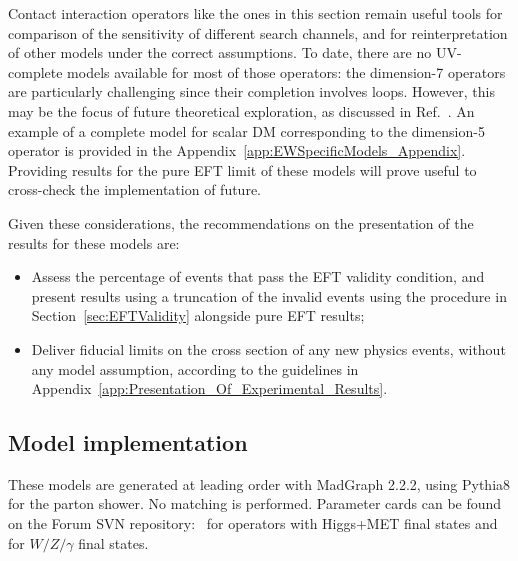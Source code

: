 Contact interaction operators like the ones in this section 
remain useful tools for comparison of the sensitivity of different search channels, 
and for reinterpretation of other models under the correct assumptions. 
To date, there are no UV-complete models available for most of those operators:
the dimension-7 operators are particularly challenging since their completion involves loops.
However, this may be the focus of future theoretical exploration, as discussed in Ref.~\cite{Crivellin:2015wva}.
An example of a complete model 
for scalar DM corresponding to the dimension-5 operator 
is provided in the Appendix~\ref{app:EWSpecificModels_Appendix}.
Providing results for the pure EFT limit of these models will prove useful
to cross-check the implementation of future. 

Given these considerations, the recommendations on the presentation of the results
for these models are: 

\begin{itemize}
\item Assess the percentage of events that pass the EFT validity condition, and present results using a truncation 
of the invalid events using the procedure in Section~\ref{sec:EFTValidity} alongside pure EFT results;
\item Deliver fiducial limits on the cross section of any new physics events, without any model assumption, according to the guidelines in Appendix~\ref{app:Presentation_Of_Experimental_Results}.  
\end{itemize}

\subsection{Model implementation}

These models are generated at leading
order with MadGraph 2.2.2, using Pythia8 for the parton shower. No matching is performed. 
Parameter cards can be found on the Forum SVN repository:~\cite{ForumSVN_EWMonoHiggs} for operators with Higgs+MET final states
and ~\cite{ForumSVN_EWEFTD7} for $W/Z/\gamma$ final states.